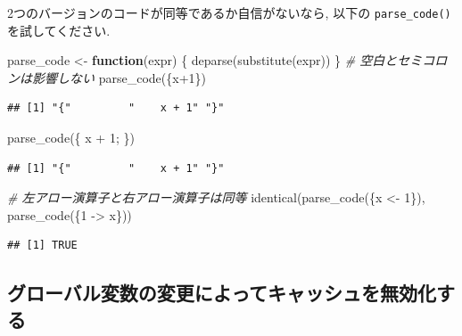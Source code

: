 \documentclass[
  11pt,
  lualatex,ja=standard,jafont=noto]{bxjsreport}
\newenvironment{Shaded}{\begin{snugshade}}{\end{snugshade}}
\newcommand{\CommentTok}[1]{\textcolor[rgb]{0.56,0.35,0.01}{\textit{#1}}}
\newcommand{\ControlFlowTok}[1]{\textcolor[rgb]{0.13,0.29,0.53}{\textbf{#1}}}
\newcommand{\DecValTok}[1]{\textcolor[rgb]{0.00,0.00,0.81}{#1}}
\newcommand{\FunctionTok}[1]{\textcolor[rgb]{0.00,0.00,0.00}{#1}}
\newcommand{\NormalTok}[1]{#1}
\newcommand{\OtherTok}[1]{\textcolor[rgb]{0.56,0.35,0.01}{#1}}
\newcommand{\SpecialCharTok}[1]{\textcolor[rgb]{0.00,0.00,0.00}{#1}}
\begin{document}
2つのバージョンのコードが同等であるか自信がないなら, 以下の \texttt{parse\_code()} を試してください.

\begin{Shaded}
\begin{Highlighting}[numbers=left,,]
\NormalTok{parse\_code }\OtherTok{\textless{}{-}} \ControlFlowTok{function}\NormalTok{(expr) \{}
  \FunctionTok{deparse}\NormalTok{(}\FunctionTok{substitute}\NormalTok{(expr))}
\NormalTok{\}}
\CommentTok{\# 空白とセミコロンは影響しない}
\FunctionTok{parse\_code}\NormalTok{(\{x}\SpecialCharTok{+}\DecValTok{1}\NormalTok{\})}
\end{Highlighting}
\end{Shaded}

\begin{verbatim}
## [1] "{"         "    x + 1" "}"
\end{verbatim}

\begin{Shaded}
\begin{Highlighting}[numbers=left,,]
\FunctionTok{parse\_code}\NormalTok{(\{ x   }\SpecialCharTok{+}    \DecValTok{1}\NormalTok{; \})}
\end{Highlighting}
\end{Shaded}

\begin{verbatim}
## [1] "{"         "    x + 1" "}"
\end{verbatim}

\begin{Shaded}
\begin{Highlighting}[numbers=left,,]
\CommentTok{\# 左アロー演算子と右アロー演算子は同等}
\FunctionTok{identical}\NormalTok{(}\FunctionTok{parse\_code}\NormalTok{(\{x }\OtherTok{\textless{}{-}} \DecValTok{1}\NormalTok{\}), }\FunctionTok{parse\_code}\NormalTok{(\{}\DecValTok{1} \OtherTok{{-}\textgreater{}}\NormalTok{ x\}))}
\end{Highlighting}
\end{Shaded}

\begin{verbatim}
## [1] TRUE
\end{verbatim}

\hypertarget{ux30b0ux30edux30fcux30d0ux30ebux5909ux6570ux306eux5909ux66f4ux306bux3088ux3063ux3066ux30adux30e3ux30c3ux30b7ux30e5ux3092ux7121ux52b9ux5316ux3059ux308b}{%
\subsection{グローバル変数の変更によってキャッシュを無効化する}\label{ux30b0ux30edux30fcux30d0ux30ebux5909ux6570ux306eux5909ux66f4ux306bux3088ux3063ux3066ux30adux30e3ux30c3ux30b7ux30e5ux3092ux7121ux52b9ux5316ux3059ux308b}}
\end{document}

